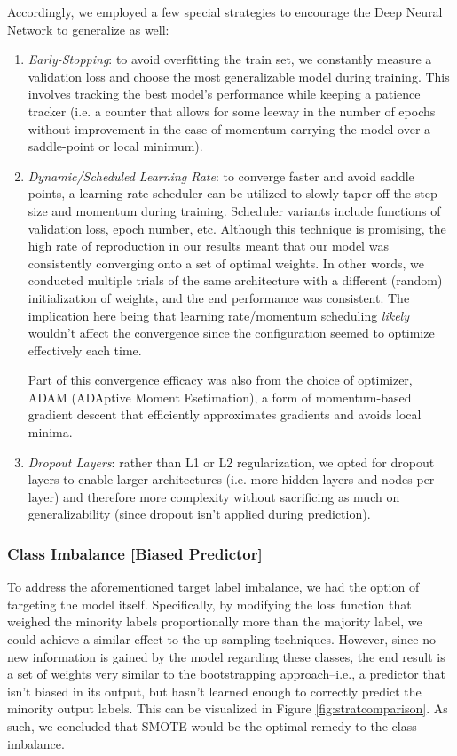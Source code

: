 \documentclass[conference]{IEEEtran}
\begin{document}
        Accordingly, we employed a few special strategies to encourage the Deep Neural Network to generalize as well:

        \begin{enumerate}[label=\roman*.]
            \item \textit{Early-Stopping}: to avoid overfitting the train set, we constantly measure a validation loss and choose the most generalizable model during training. This involves tracking the best model's performance while keeping a patience tracker (i.e. a counter that allows for some leeway in the number of epochs without improvement in the case of momentum carrying the model over a saddle-point or local minimum).

            \item \textit{Dynamic/Scheduled Learning Rate}: to converge faster and avoid saddle points, a learning rate scheduler can be utilized to slowly taper off the step size and momentum during training. Scheduler variants include functions of validation loss, epoch number, etc. Although this technique is promising, the high rate of reproduction in our results meant that our model was consistently converging onto a set of optimal weights. In other words, we conducted multiple trials of the same architecture with a different (random) initialization of weights, and the end performance was consistent. The implication here being that learning rate/momentum scheduling \textit{likely} wouldn't affect the convergence since the configuration seemed to optimize effectively each time.

            Part of this convergence efficacy was also from the choice of optimizer, ADAM (ADAptive Moment Esetimation), a form of momentum-based gradient descent that efficiently approximates gradients and avoids local minima.

            \item \textit{Dropout Layers}: rather than L1 or L2 regularization, we opted for dropout layers to enable larger architectures (i.e. more hidden layers and nodes per layer) and therefore more complexity without sacrificing as much on generalizability (since dropout isn't applied during prediction).
        \end{enumerate}

        \subsubsection{Class Imbalance [Biased Predictor]}\label{sec:imbalance}
        To address the aforementioned target label imbalance, we had the option of targeting the model itself. Specifically, by modifying the loss function that weighed the minority labels proportionally more than the majority label, we could achieve a similar effect to the up-sampling techniques. However, since no new information is gained by the model regarding these classes, the end result is a set of weights very similar to the bootstrapping approach--i.e., a predictor that isn't biased in its output, but hasn't learned enough to correctly predict the minority output labels. This can be visualized in Figure \ref{fig:stratcomparison}. As such, we concluded that SMOTE would be the optimal remedy to the class imbalance.
\end{document}
